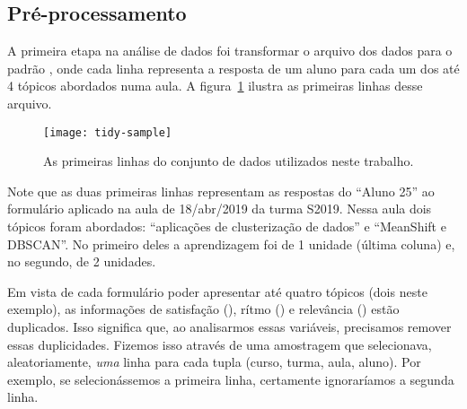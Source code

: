 \subsection{Pré-processamento}

A primeira etapa na análise de dados foi transformar o arquivo dos dados para o padrão  \cite{Wicham2014}, onde cada linha representa a resposta de um aluno para cada um dos até 4 tópicos abordados numa aula.
A figura~\ref{fig:dataset-raw} ilustra as primeiras linhas desse arquivo.

\begin{figure}
	\centering
	\texttt{[image: tidy-sample]}
	\caption{As primeiras linhas do conjunto de dados utilizados neste trabalho.}
	\label{fig:dataset-raw}
\end{figure}

Note que as duas primeiras linhas representam as respostas do ``Aluno 25'' ao formulário aplicado na aula de 18/abr/2019 da turma S2019. Nessa aula dois tópicos foram abordados: ``aplicações de clusterização de dados'' e ``MeanShift e DBSCAN''. No primeiro deles a aprendizagem foi de 1 unidade (última coluna) e, no segundo, de 2 unidades.

Em vista de cada formulário poder apresentar até quatro tópicos (dois neste exemplo), as informações de satisfação (), rítmo () e relevância () estão duplicados. Isso significa que, ao analisarmos essas variáveis, precisamos remover essas duplicidades.
Fizemos isso através de uma amostragem que selecionava, aleatoriamente, \emph{uma} linha para cada tupla (curso, turma, aula, aluno).
Por exemplo, se selecionássemos a primeira linha, certamente ignoraríamos a segunda linha.

